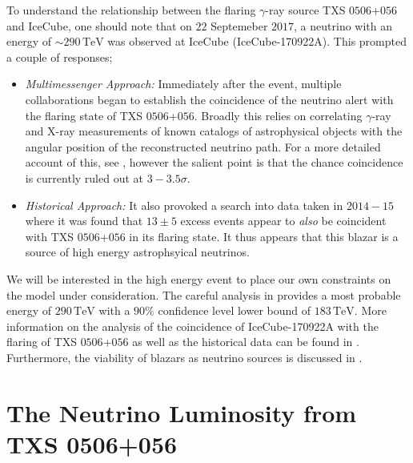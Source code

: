 \documentclass[11pt]{article}
\numberwithin{equation}{section}
\numberwithin{figure}{section}
\numberwithin{table}{section}
\begin{document}
To understand the relationship between the flaring $\gamma$-ray source TXS $0506$+$056$ and IceCube, one should note that on $22$ Septemeber $2017$, a neutrino with an energy of $\sim 290\,\textrm{TeV}$ was observed at IceCube (IceCube-170922A). This prompted a couple of responses;
\begin{itemize}
  \item \textit{Multimessenger Approach:} Immediately after the event, multiple collaborations began to establish the coincidence of the neutrino alert with the flaring state of TXS $0506$+$056$. Broadly this relies on correlating $\gamma$-ray and X-ray measurements of known catalogs of astrophysical objects with the angular position of the reconstructed neutrino path. For a more detailed account of this, see \cite{Ackermann2018}, however the salient point is that the chance coincidence is currently ruled out at $3-3.5\sigma$.
  \item \textit{Historical Approach:} It also provoked a search into data taken in $2014-15$ where it was found that $13 \pm 5$ excess events \cite{Kelly} appear to \textit{also} be coincident with TXS $0506$+$056$ in its flaring state. It thus appears that this blazar is a source of high energy astrophsyical neutrinos.
\end{itemize}
We will be interested in the high energy event to place our own constraints on the model under consideration. The careful analysis in \cite{Ackermann2018} provides a most probable energy of $290 \, \textrm{TeV}$ with a $90\%$ confidence level lower bound of $183 \, \textrm{TeV}$. More information on the analysis of the coincidence of IceCube-170922A with the flaring of TXS $0506$+$056$ as well as the historical data can be found in \cite{Ackermann2018, IceCube2018, Kelly, Padovani2018}. Furthermore, the viability of blazars as neutrino sources is discussed in \cite{Hooper2018, IceCube2018}.


\section{The Neutrino Luminosity from TXS 0506+056}\label{sec:nuluminosity}
\end{document}
